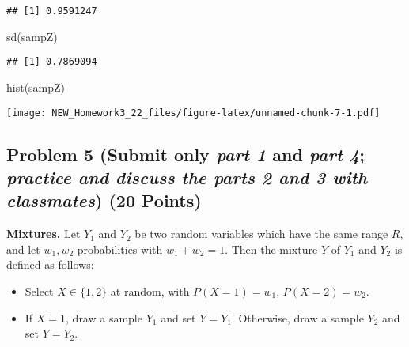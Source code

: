 \documentclass[
]{article}
\newenvironment{Shaded}{\begin{snugshade}}{\end{snugshade}}
\newcommand{\FunctionTok}[1]{\textcolor[rgb]{0.00,0.00,0.00}{#1}}
\newcommand{\NormalTok}[1]{#1}
\begin{document}
\begin{verbatim}
## [1] 0.9591247
\end{verbatim}

\begin{Shaded}
\begin{Highlighting}[]
\FunctionTok{sd}\NormalTok{(sampZ)}
\end{Highlighting}
\end{Shaded}

\begin{verbatim}
## [1] 0.7869094
\end{verbatim}

\begin{Shaded}
\begin{Highlighting}[]
\FunctionTok{hist}\NormalTok{(sampZ)}
\end{Highlighting}
\end{Shaded}

\texttt{[image: NEW\_Homework3\_22\_files/figure-latex/unnamed-chunk-7-1.pdf]}

\hypertarget{problem-5-submit-only-part-1-and-part-4-practice-and-discuss-the-parts-2-and-3-with-classmates-20-points}{%
\subsection{\texorpdfstring{Problem 5 (Submit only \emph{\emph{part 1}}
and \emph{\emph{part 4}}; \emph{practice and discuss the parts 2 and 3
with classmates}) (20
Points)}{Problem 5 (Submit only part 1 and part 4; practice and discuss the parts 2 and 3 with classmates) (20 Points)}}\label{problem-5-submit-only-part-1-and-part-4-practice-and-discuss-the-parts-2-and-3-with-classmates-20-points}}

\textbf{Mixtures.} Let \(Y_1\) and \(Y_2\) be two random variables which
have the same range \(R\), and let \(w_1, w_2\) probabilities with
\(w_1 + w_2 = 1\). Then the mixture \(Y\) of \(Y_1\) and \(Y_2\) is
defined as follows:

\begin{itemize}
\item
  Select \(X \in \{1,2\}\) at random, with
  \(P(X = 1) = w_1, \, P(X = 2) = w_2\).
\item
  If \(X = 1\), draw a sample \(Y_1\) and set \(Y = Y_1\). Otherwise,
  draw a sample \(Y_2\) and set \(Y = Y_2\).
\end{itemize}

\smallskip
\end{document}
